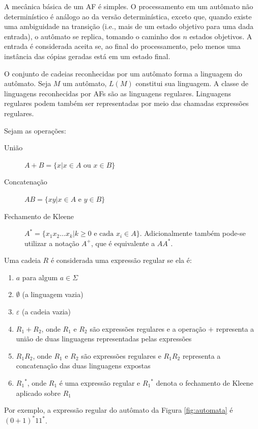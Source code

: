 \documentclass[12pt,a4paper]{article}
\begin{document}
A mecânica básica de um AF é simples.
O processamento em um autômato não determinístico é análogo ao da versão
determinística, exceto que, quando existe uma ambiguidade na transição (i.e.,
mais de um estado objetivo para uma dada entrada), o autômato se replica, tomando
o caminho dos $n$ estados objetivos. A entrada é considerada aceita se, ao
final do processamento, pelo menos uma instância das cópias geradas está em um
estado final.

O conjunto de cadeias reconhecidas por um autômato forma a linguagem do
autômato. Seja $M$ um autômato, $L(M)$ constitui sua linguagem. A classe
de linguagens reconhecidas por AFs são as linguagens regulares.
Linguagens regulares podem também ser representadas por meio das chamadas
expressões regulares.

Sejam as operações:

\begin{description}
\item[União] $A+B=\{x | x \in A \mbox{ ou } x \in B\}$
\item[Concatenação] $AB=\{xy | x \in A \mbox{ e } y \in B\}$
\item[Fechamento de Kleene] $A^*=\{x_1x_2 \ldots x_k | k \ge 0 \mbox{ e cada } x_i \in A\}$.
Adicionalmente também pode-se utilizar a notação $A^+$, que é equivalente a $AA^*$.
\end{description}

Uma cadeia $R$ é considerada uma expressão regular 
se ela é:

\begin{enumerate}
\item $a$ para algum $a \in \Sigma$
\item $\emptyset$ (a linguagem vazia)
\item $\varepsilon$ (a cadeia vazia)
\item $R_1+R_2$, onde $R_1$ e $R_2$ são expressões regulares e
a operação $+$ representa a união de duas linguagens representadas pelas expressões
\item $R_1R_2$, onde $R_1$ e $R_2$ são expressões regulares e $R_1R_2$ representa
a concatenação das duas linguagens expostas
\item ${R_1}^*$, onde $R_1$ é uma expressão regular e ${R_1}^*$ denota o fechamento
de Kleene aplicado sobre $R_1$
\end{enumerate}

Por exemplo, a expressão regular do autômato da Figura \ref{fig:automata}
é $(0+1)^*11^*$.
\end{document}
